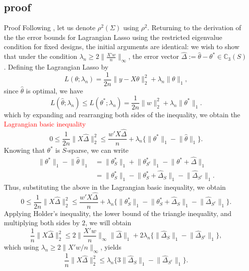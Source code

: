 \documentclass[10pt,handout,english]{beamer}
\begin{document}
\subsection{proof}
\begin{frame}[allowframebreaks]{Proof}
Following \citet{wainwright2019high}, let us denote $\rho^2(\Sigma)$ using $\rho^2$. Returning to the derivation of the the error bounds for Lagrangian Lasso using the restricted eigenvalue condition for fixed designs, the initial arguments are identical: we wish to show that under the condition $\lambda_n\geq 2\lVert\frac{X'w}{n}\rVert_{\infty}$, the error vector $\hat{\Delta}:=\hat{\theta}-\theta^* \in \mathbb{C}_{3}(S)$. Defining the Lagrangian Lasso by
\[
L(\theta;\lambda_n)=\frac{1}{2n}\lVert y-X\theta\rVert_2^2+\lambda_n\lVert\theta\rVert_1,
\]
since $\hat{\theta}$ is optimal, we have
\[
L(\hat{\theta};\lambda_n)\leq L(\theta^*;\lambda_n)=\frac{1}{2n}\lVert w\rVert_2^2+\lambda_n\lVert \theta^*\rVert_1.
\]
which by expanding and rearranging both sides of the inequality, we obtain the \textcolor{red}{Lagrangian basic inequality}
\[
0\leq\frac{1}{2n}\lVert X\hat{\Delta}\rVert_2^2\leq \frac{w'X\hat{\Delta}}{n}+\lambda_n\{\lVert\theta^*\rVert_1-\lVert\hat{\theta}\rVert_1\}.
\]
Knowing that $\theta^*$ is $S$-sparse, we can write
\begin{align*}
\lVert\theta^*\rVert_1-\lVert\hat{\theta}\rVert_1&=\lVert\theta_S^*\rVert_1+\lVert\theta_{S^c}^*\rVert_1-\lVert\theta^*+\hat{\Delta}\rVert_1\\
&=\lVert\theta_S^*\rVert_1-\lVert\theta_S^*+\hat{\Delta}_S\rVert_1-\lVert\hat{\Delta}_{S
^c}\rVert_1.
\end{align*}
Thus, substituting the above in the Lagrangian basic inequality, we obtain
\[
0\leq\frac{1}{2n}\lVert X\hat{\Delta}\rVert_2^2\leq \frac{w'X\hat{\Delta}}{n}+\lambda_n\{\lVert\theta_S^*\rVert_1-\lVert\theta_S^*+\hat{\Delta}_S\rVert_1-\lVert\hat{\Delta}_{S
^c}\rVert_1\}.
\]
Applying Holder's inequality, the lower bound of the triangle inequality, and multiplying both sides by $2$, we will obtain
\[
\frac{1}{n}\lVert X\hat{\Delta}\rVert_2^2\leq 2\Big\lVert \frac{X'w}{n}\Big\rVert_{\infty}\lVert \hat{\Delta}\rVert_1+2\lambda_n\{\lVert\hat{\Delta}_S\rVert_1-\lVert\hat{\Delta}_{S^c}\rVert_1\},
\]
which using $\lambda_n\geq 2\lVert X'w/n\rVert_{\infty}$, yields
\[
\frac{1}{n}\lVert X\hat{\Delta}\rVert_2^2\leq \lambda_n \{3\lVert\hat{\Delta}_S\rVert_1-\lVert\hat{\Delta}_{S^c}\rVert_1\}.
\]


\end{frame}
\end{document}

